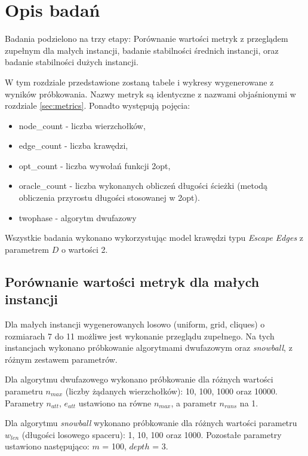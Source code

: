 \section{Opis badań}

Badania podzielono na trzy etapy: Porównanie wartości metryk z przeglądem zupełnym dla małych instancji,
badanie stabilności średnich instancji, oraz badanie stabilności dużych instancji.

W tym rozdziale przedstawione zostaną tabele i wykresy wygenerowane z wyników próbkowania.
Nazwy metryk są identyczne z nazwami objaśnionymi w rozdziale \ref{sec:metrics}.
Ponadto występują pojęcia:

\begin{itemize}
    \item node\_count - liczba wierzchołków,
    \item edge\_count - liczba krawędzi,
    \item opt\_count - liczba wywołań funkcji 2opt,
    \item oracle\_count - liczba wykonanych obliczeń długości ścieżki (metodą obliczenia przyrostu długości stosowanej w 2opt).
    \item twophase - algorytm dwufazowy
\end{itemize}

Wszystkie badania wykonano wykorzystując model krawędzi typu \textit{Escape Edges} z parametrem $D$ o wartości 2.

\subsection{Porównanie wartości metryk dla małych instancji}
Dla małych instancji wygenerowanych losowo (uniform, grid, cliques) o rozmiarach 7 do 11
możliwe jest wykonanie przeglądu zupełnego.
Na tych instancjach wykonano próbkowanie algorytmami dwufazowym oraz \textit{snowball}, z różnym zestawem parametrów.

Dla algorytmu dwufazowego wykonano próbkowanie dla różnych wartości parametru $n_{max}$ (liczby żądanych wierzchołków): 10, 100, 1000 oraz 10000.
Parametry $n_{att}$, $e_{att}$ ustawiono na równe $n_{max}$, a parametr $n_{runs}$ na 1.

Dla algorytmu \textit{snowball} wykonano próbkowanie dla różnych wartości parametru $w_{len}$ (długości losowego spaceru): 1, 10, 100 oraz 1000.
Pozostałe parametry ustawiono następująco: $m$ = 100, $depth$ = 3.

